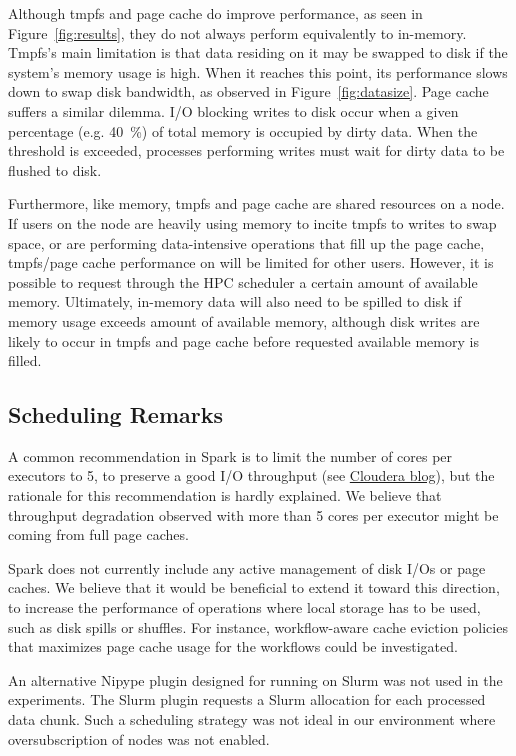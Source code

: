 \documentclass{IEEEtran}
\begin{document}
Although tmpfs and page cache do improve performance, as seen in
Figure~\ref{fig:results}, they do not always perform equivalently to in-memory. 
Tmpfs's main limitation is that data residing on it may be swapped to disk if 
the system's memory usage is high. When it reaches this point, its performance 
slows down to swap disk bandwidth, as observed in Figure~\ref{fig:datasize}. Page cache suffers a similar dilemma. I/O blocking writes to disk occur when a given percentage (e.g. 40~\%)
of total memory is occupied by dirty data. When the threshold is exceeded,
processes performing writes must wait for dirty data to be flushed to disk.

Furthermore, like memory, tmpfs and page cache are shared resources on a node.
If users on the node are heavily using memory to incite tmpfs to writes to swap space, or are performing data-intensive operations
that fill up the page cache, tmpfs/page cache performance on will be limited for other users. 
However, it is possible to request through the HPC scheduler a certain
amount of available memory. Ultimately, in-memory data will also need to be spilled to
disk if memory usage exceeds amount of available memory, although disk writes are 
likely to occur in tmpfs and page cache before requested available memory is filled.

\subsection{Scheduling Remarks}

A common recommendation in Spark is to limit the number of cores per 
executors to 5, to preserve a good I/O 
throughput (see \href{http://blog.cloudera.com/blog/2015/03/how-to-tune-your-apache-spark-jobs-part-2}{Cloudera blog}), 
but the rationale for this recommendation is hardly explained. We 
believe that throughput degradation observed with more than 5 cores per 
executor might be coming from full page caches.

Spark does not currently include any active management of disk I/Os or 
page caches. We believe that it would be beneficial to extend it toward 
this direction, to increase the performance of operations where local 
storage has to be used, such as disk spills or shuffles. For instance, 
workflow-aware cache eviction policies that maximizes page cache usage 
for the workflows could be investigated. 

An alternative Nipype plugin designed for running on Slurm was not used 
in the experiments. The Slurm plugin requests a Slurm allocation for 
each processed data chunk. Such a scheduling strategy was not ideal in 
our environment where oversubscription of nodes was not enabled.
\end{document}
